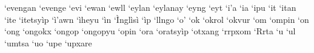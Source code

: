 \documentclass[a4paper]{article}
\begin{document}
`evengan\hspace{2mm}
`evenge\hspace{2mm}
`evi\hspace{2mm}
`ewan\hspace{2mm}
`ewll\hspace{2mm}
`eylan\hspace{2mm}
`eylanay\hspace{2mm}
`eyng\hspace{2mm}
`eyt\hspace{2mm}
`i'a\hspace{2mm}
`ia\hspace{2mm}
`ipu\hspace{2mm}
`it\hspace{2mm}
`itan\hspace{2mm}
`ite\hspace{2mm}
`itetsyìp\hspace{2mm}
`ì'awn\hspace{2mm}
`ìheyu\hspace{2mm}
`ìn\hspace{2mm}
`Ìnglìsì\hspace{2mm}
`ìp\hspace{2mm}
`llngo\hspace{2mm}
`o'\hspace{2mm}
`ok\hspace{2mm}
`okrol\hspace{2mm}
`okvur\hspace{2mm}
`om\hspace{2mm}
`ompin\hspace{2mm}
`on\hspace{2mm}
`ong\hspace{2mm}
`ongokx\hspace{2mm}
`ongop\hspace{2mm}
`ongopyu\hspace{2mm}
`opin\hspace{2mm}
`ora\hspace{2mm}
`oratsyìp\hspace{2mm}
`otxang\hspace{2mm}
`rrpxom\hspace{2mm}
`Rrta\hspace{2mm}
`u\hspace{2mm}
`ul\hspace{2mm}
`umtsa\hspace{2mm}
`uo\hspace{2mm}
`upe\hspace{2mm}
`upxare\hspace{2mm}
\end{document}
